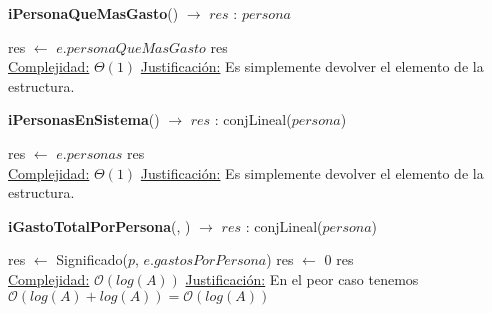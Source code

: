 \begin{Algoritmos}
    \begin{algorithm}
    \caption{\textbf{iPersonaQueMasGasto}() $\to$ $res$ : $persona$}
    \begin{algorithmic}
        \State res $\gets$ $e.personaQueMasGasto$
        \State \Return res
        \\
        \Statex \underline{Complejidad:} $\Theta(1)$
        \Statex \underline{Justificación:} Es simplemente devolver el elemento de la estructura.
    \end{algorithmic}
    \end{algorithm}

    \begin{algorithm}
    \caption{\textbf{iPersonasEnSistema}() $\to$ $res$ : conjLineal($persona$)}
    \begin{algorithmic}
        \State res $\gets$ $e.personas$
        \State \Return res
        \\
        \Statex \underline{Complejidad:} $\Theta(1)$
        \Statex \underline{Justificación:} Es simplemente devolver el elemento de la estructura.
    \end{algorithmic}
    \end{algorithm}

    \begin{algorithm}
    \caption{\textbf{iGastoTotalPorPersona}(, ) $\to$ $res$ : conjLineal($persona$)}
    \begin{algorithmic}
          
            \State res $\gets$ Significado($p$, $e.gastosPorPersona$)  
        \Else
            \State res $\gets$ 0  
        \EndIf
        \State \Return res
        \\
        \Statex \underline{Complejidad:} $\mathcal{O}(log(A))$
        \Statex \underline{Justificación:} En el peor caso tenemos $\mathcal{O}(log(A) + log(A)) = \mathcal{O}(log(A))$
    \end{algorithmic}
    \end{algorithm}


\end{Algoritmos}
